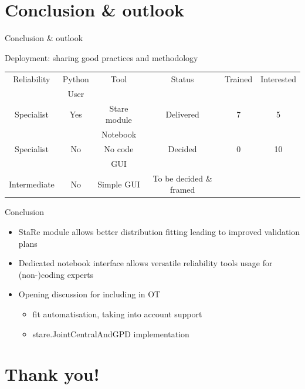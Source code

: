 \documentclass{renault-template}
\begin{document}
\section*{Conclusion \& outlook}
\begin{frame}{Conclusion \& outlook}

  \begin{block}{Deployment: sharing good practices and methodology}
    \small
    \begin{center}
      \begin{tabular}{|c|c|c|c|c|c|}
        \hline
        Reliability&Python &Tool&Status&Trained&Interested\\
        & User  &    &      &       & \\
        \hline\hline
        Specialist & Yes & Stare module & Delivered&7&5\\
        &  & Notebook &  & & \\
        \hline
        Specialist&No&No code&Decided&0&10\\
        & &GUI& & & \\\hline
        Intermediate&No&Simple GUI&To be decided \& framed& & \\
        \hline
      \end{tabular}
    \end{center}
  \end{block}

  \begin{block}{Conclusion}
    \begin{itemize}
    \item StaRe module allows better distribution fitting leading to improved validation plans
    \item Dedicated notebook interface allows versatile reliability tools usage for (non-)coding experts
    \item Opening discussion for including in OT
      \begin{itemize}
      \item fit automatisation, taking into account support
      \item stare.JointCentralAndGPD implementation
      \end{itemize}
    \end{itemize}
  \end{block}

\end{frame}

\section*{Thank you!}
\end{document}

